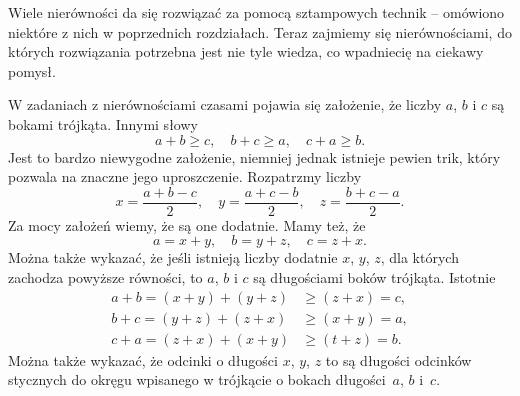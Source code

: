 

\noindent
Wiele nierówności da się rozwiązać za pomocą sztampowych technik -- omówiono niektóre z nich w poprzednich rozdziałach. Teraz zajmiemy się nierównościami, do których rozwiązania potrzebna jest nie tyle wiedza, co wpadniecię na ciekawy pomysł. 

\vspace{10px}



\noindent
W zadaniach z nierównościami czasami pojawia się założenie, że liczby $a$, $b$ i $c$ są bokami trójkąta. Innymi słowy
\[
	a + b \geqslant c, \quad b + c \geqslant a, \quad c + a \geqslant b.
\]
Jest to bardzo niewygodne założenie, niemniej jednak istnieje pewien trik, który pozwala na znaczne jego uproszczenie. Rozpatrzmy liczby
\[
	x = \frac{a + b - c}{2}, \quad y = \frac{a + c - b}{2}, \quad z = \frac{b + c - a}{2}.
\]
Za mocy założeń wiemy, że są one dodatnie. Mamy też, że
\[
	a = x + y, \quad b = y + z, \quad c = z + x.
\]
Można także wykazać, że jeśli istnieją liczby dodatnie $x$, $y$, $z$, dla których zachodza powyższe równości, to $a$, $b$ i $c$ są długościami boków trójkąta. Istotnie
\begin{align*}
	a + b = (x + y) + (y + z) &\geqslant (z + x) = c, \\
	b + c = (y + z) + (z + x) &\geqslant (x + y) = a, \\
	c + a = (z + x) + (x + y) &\geqslant (t + z) = b.
\end{align*}
Można także wykazać, że odcinki o długości $x$, $y$, $z$ to są długości odcinków stycznych do okręgu wpisanego w trójkącie o bokach długości~$a$, $b$ i~$c$.

\begin{center}
\end{center}

